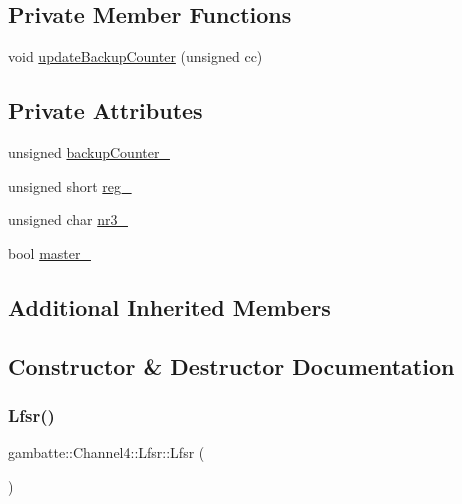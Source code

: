 \subsection*{Private Member Functions}
\begin{DoxyCompactItemize}
\item 
void \hyperlink{classgambatte_1_1Channel4_1_1Lfsr_a1a123ac84edbac35f1d63be538afa0aa}{update\+Backup\+Counter} (unsigned cc)
\end{DoxyCompactItemize}
\subsection*{Private Attributes}
\begin{DoxyCompactItemize}
\item 
unsigned \hyperlink{classgambatte_1_1Channel4_1_1Lfsr_aa87d60c609b2fdf21e1344430e4f8098}{backup\+Counter\+\_\+}
\item 
unsigned short \hyperlink{classgambatte_1_1Channel4_1_1Lfsr_a1c1805ef084771b4cc2e9905d35f93b9}{reg\+\_\+}
\item 
unsigned char \hyperlink{classgambatte_1_1Channel4_1_1Lfsr_a831fdbeb316609dc1e4c78f11891a2bb}{nr3\+\_\+}
\item 
bool \hyperlink{classgambatte_1_1Channel4_1_1Lfsr_a93cd98bd46a36129edf01ea052358c8b}{master\+\_\+}
\end{DoxyCompactItemize}
\subsection*{Additional Inherited Members}


\subsection{Constructor \& Destructor Documentation}
\mbox{\label{classgambatte_1_1Channel4_1_1Lfsr_a070b6af35c8738378554108722c117ae}} 
\subsubsection{\texorpdfstring{Lfsr()}{Lfsr()}}
{\footnotesize\ttfamily gambatte\+::\+Channel4\+::\+Lfsr\+::\+Lfsr (\begin{DoxyParamCaption}{ }\end{DoxyParamCaption})}




